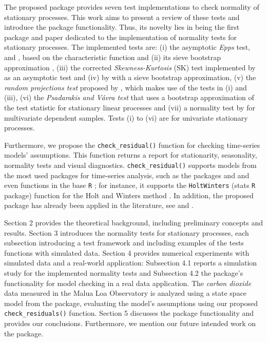 The proposed  package provides seven test implementations to check normality of stationary processes. This work aims to present a review of these tests and introduce the package functionality. Thus, its novelty lies in being the first package and paper dedicated to the implementation of normality tests for stationary processes. The implemented tests are: (i) the asymptotic \emph{Epps} test, \citep{epps1987} and \citep{nietoreyes2014}, based on the characteristic function and (ii) its sieve bootstrap approximation \citep{psaradakis2020normality}, (iii) the corrected \emph{Skewness-Kurtosis} (SK) test implemented by \citet{Lobato2004} as an asymptotic test and (iv) by \citet{psaradakis2020normality} with a sieve bootstrap approximation, (v) the \emph{random projections test} proposed by \citet{nietoreyes2014}, which makes use of the tests in (i) and (iii), (vi) the \emph{Psadarakis and Vávra test} \citep{vavra2017} that uses a bootstrap approximation of the \citet{anderson1952} test statistic for stationary linear processes and (vii) a normality test by \citet{el2022normality} for multivariate dependent samples. Tests (i) to (vi) are for univariate stationary processes.

Furthermore, we propose the \texttt{check\_residual()} function for checking time-series models' assumptions. This function returns a report for stationarity, seasonality, normality tests and visual diagnostics. \texttt{check\_residual()} supports models from the most used packages for time-series analysis, such as the packages  \citep{Rob2007} and  \citep{aTSA} and even functions in the base \texttt{R} \citep{R}; for instance, it supports the \texttt{HoltWinters} (stats \texttt{R} package) function for the Holt and Winters method \citep{Holt2004}. In addition, the proposed  package has already been applied in the literature, see \citet{Nieto-Reyes:2022-1} and \citet{Nieto-Reyes:2022-2}.

Section 2 provides the theoretical background, including preliminary concepts and results. Section 3 introduces the normality tests for stationary processes, each subsection introducing a test framework and including examples of the tests functions with simulated data. Section 4 provides numerical experiments with simulated data and a real-world application: Subsection 4.1 reports a simulation study for the implemented normality tests and Subsection 4.2 the package's functionality for model checking in a real data application. The \emph{carbon dioxide} data measured in the Malua Loa Observatory \citep{astsa} is analyzed using a state space model from the  package, evaluating the model's assumptions using our proposed \texttt{check\_residuals()} function. Section 5 discusses the package functionality and provides our conclusions. Furthermore, we mention our future intended work on the package.

